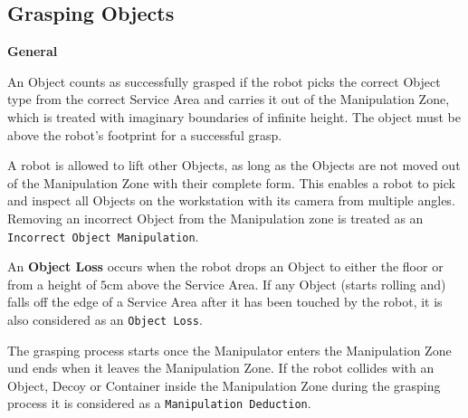 





\subsection{Grasping Objects} \label{ssec:GraspingObjects}

\textbf{General}

An Object counts as successfully grasped if the robot picks the correct Object type from the correct Service Area and carries it out of the Manipulation Zone, which is treated with imaginary boundaries of infinite height. 
The object must be above the robot's footprint for a successful grasp.

A robot is allowed to lift other Objects, as long as the Objects are not moved out of the Manipulation Zone with their complete form. 
This enables a robot to pick and inspect all Objects on the workstation with its camera from multiple angles. 
Removing an incorrect Object from the Manipulation zone is treated as an \texttt{Incorrect Object Manipulation}.

An \textbf{Object Loss} occurs when the robot drops an Object to either the floor or from a height of $5\si{\centi\meter}$ above the Service Area. If any Object (starts rolling and) falls off the edge of a Service Area after it has been touched by the robot, it is also considered as an \texttt{Object Loss}. 

The grasping process starts once the Manipulator enters the Manipulation Zone und ends when it leaves the Manipulation Zone.
If the robot collides with an Object, Decoy or Container inside the Manipulation Zone during the grasping process it is considered as a \texttt{Manipulation Deduction}.

